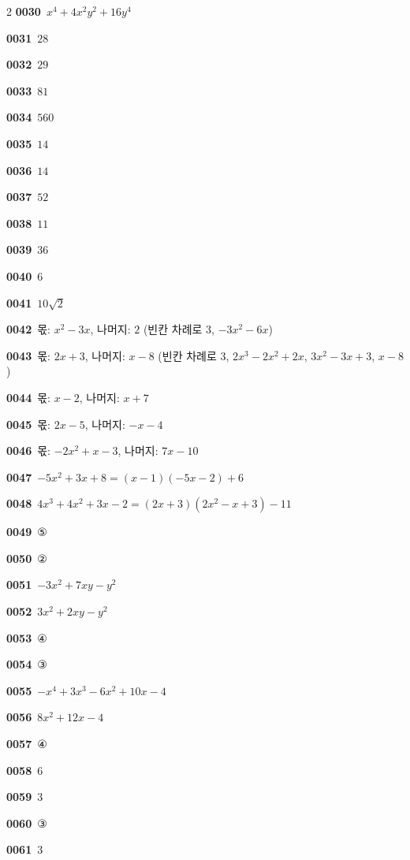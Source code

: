 \documentclass[10pt,a4paper]{article}
\begin{document}
\begin{multicols}{2}
\noindent\textbf{0030}\ $x^4+4x^2y^2+16y^4$\par
\noindent\textbf{0031}\ $28$\par
\noindent\textbf{0032}\ $29$\par
\noindent\textbf{0033}\ $81$\par
\noindent\textbf{0034}\ $560$\par
\noindent\textbf{0035}\ $14$\par
\noindent\textbf{0036}\ $14$\par
\noindent\textbf{0037}\ $52$\par
\noindent\textbf{0038}\ $11$\par
\noindent\textbf{0039}\ $36$\par
\noindent\textbf{0040}\ $6$\par
\noindent\textbf{0041}\ $10\sqrt{2}$\par
\noindent\textbf{0042}\ 몫: $x^2-3x$, 나머지: $2$ (빈칸 차례로 $3$, $-3x^2-6x$)\par
\noindent\textbf{0043}\ 몫: $2x+3$, 나머지: $x-8$ (빈칸 차례로 $3$, $2x^3-2x^2+2x$, $3x^2-3x+3$, $x-8$)\par
\noindent\textbf{0044}\ 몫: $x-2$, 나머지: $x+7$\par
\noindent\textbf{0045}\ 몫: $2x-5$, 나머지: $-x-4$\par
\noindent\textbf{0046}\ 몫: $-2x^2+x-3$, 나머지: $7x-10$\par
\noindent\textbf{0047}\ $-5x^2+3x+8=(x-1)(-5x-2)+6$\par
\noindent\textbf{0048}\ $4x^3+4x^2+3x-2=(2x+3)(2x^2-x+3)-11$\par
\noindent\textbf{0049}\ ⑤\par
\noindent\textbf{0050}\ ②\par
\noindent\textbf{0051}\ $-3x^2+7xy-y^2$\par
\noindent\textbf{0052}\ $3x^2+2xy-y^2$\par
\noindent\textbf{0053}\ ④\par
\noindent\textbf{0054}\ ③\par
\noindent\textbf{0055}\ $-x^4+3x^3-6x^2+10x-4$\par
\noindent\textbf{0056}\ $8x^2+12x-4$\par
\noindent\textbf{0057}\ ④\par
\noindent\textbf{0058}\ $6$\par
\noindent\textbf{0059}\ $3$\par
\noindent\textbf{0060}\ ③\par
\noindent\textbf{0061}\ $3$\par

\end{multicols}
\end{document}
